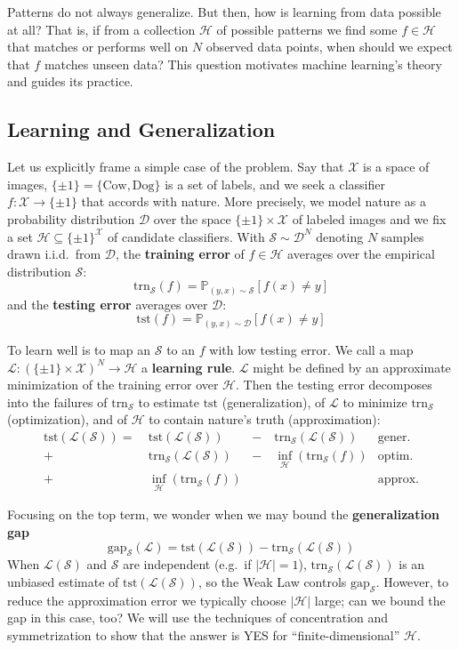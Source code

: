 \documentclass[twocolumn, 11pt]{article}
\newcommand{\PP}{\mathbb{P}}
\newcommand{\Dd}{\mathcal{D}}
\newcommand{\Hh}{\mathcal{H}}
\newcommand{\Ll}{\mathcal{L}}
\newcommand{\Ss}{\mathcal{S}}
\newcommand{\Xx}{\mathcal{X}}
\newcommand{\Ein}  {\text{trn}_{\Ss}}
\newcommand{\Egap} {\text{gap}_{\Ss}}
\newcommand{\Eout} {\text{tst}}
\theoremstyle{definition}
\newcommand{\msec}[1]{\subsection*{\color{mblu}\textsf{#1}}}
\begin{document}
        Patterns do not always generalize.  But then, how is learning from data
        possible at all? 
        That is, if from a collection $\Hh$ of possible patterns we find some
        $f\in \Hh$ that matches or performs well on $N$ observed data points,
        when should we expect that $f$ matches unseen data?  This question
        motivates machine learning's theory and guides its practice.

    \msec{Learning and Generalization}
        Let us explicitly frame a simple case of the problem.
        Say that $\Xx$ is a space of images, $\{\pm 1\} =
        \{\text{Cow}, \text{Dog}\}$ is a set of labels, and we seek a
        classifier $f: \Xx\to\{\pm 1\}$ that accords with nature.  More
        precisely, we model nature as a probability distribution $\Dd$ over the
        space $\{\pm 1\}\times\Xx$ of labeled images and we fix a set $\Hh
        \subseteq \{\pm 1\}^\Xx$ of candidate classifiers.  With $\Ss \sim
        \Dd^N$ denoting $N$ samples drawn i.i.d.\ from $\Dd$, the
        \textbf{training error} of $f\in \Hh$ averages over the empirical
        distribution $\Ss$:
        $$
            \Ein(f) = \PP_{(y,x)\sim \Ss}[f(x)\neq y] 
        $$
        and the \textbf{testing error} averages over $\Dd$:
        $$
            \Eout(f) = \PP_{(y,x)\sim \Dd}[f(x)\neq y] 
        $$

        To learn well is to map an $\Ss$ to an $f$ with low testing error.  We
        call a map $\Ll: (\{\pm 1\}\times\Xx)^N \to \Hh$ a \textbf{learning
        rule}.  $\Ll$ might be defined by an approximate minimization of the
        training error over $\Hh$.  Then the testing error decomposes into the
        failures
        of $\Ein$ to estimate $\Eout$ (generalization),
        of $\Ll$ to minimize $\Ein$ (optimization), and 
        of $\Hh$ to contain nature's truth (approximation): 
        \newcommand{\minf}[1]{{\inf}_{\Hh}}
        \begin{align*}
            \Eout(\Ll(\Ss)) 
            =~&\Eout(\Ll(\Ss))           &-~&           \Ein(\Ll(\Ss))& \text{gener.} \\
            +~&\Ein(\Ll(\Ss))            &-~& \minf{\Hh}(\Ein(f))& \text{optim.} \\
            +~&\minf{\Hh}(\Ein(f))  &  &                         & \text{approx.}  
        \end{align*}
        
        Focusing on the top term, we wonder when we may bound the
        \textbf{generalization gap} 
        $$
            \Egap(\Ll) = \Eout(\Ll(\Ss)) - \Ein(\Ll(\Ss)) 
        $$
        When $\Ll(\Ss)$ and $\Ss$ are independent (e.g.\ if $|\Hh|=1$),
        $\Ein(\Ll(\Ss))$ is an unbiased estimate of $\Eout(\Ll(\Ss))$, so the
        Weak Law controls $\Egap$.  However, to reduce the approximation error
        we typically choose $|\Hh|$ large; can we bound the gap in
        this case, too?
        We will use the techniques of concentration and symmetrization to show
        that the answer is YES for ``finite-dimensional'' $\Hh$.
\end{document}
